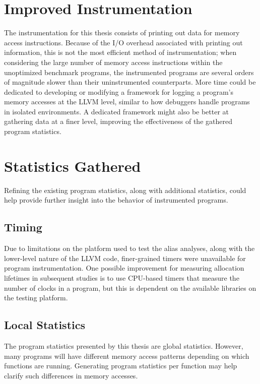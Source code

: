 \section{Improved Instrumentation}
The instrumentation for this thesis consists of printing out data for memory access instructions. Because of the I/O overhead associated with printing out information, this is not the most efficient method of instrumentation; when considering the large number of memory access instructions within the unoptimized benchmark programs, the instrumented programs are several orders of magnitude slower than their uninstrumented counterparts. More time could be dedicated to developing or modifying a framework for logging a program's memory accesses at the LLVM level, similar to how debuggers handle programs in isolated environments. A dedicated framework might also be better at gathering data at a finer level, improving the effectiveness of the gathered program statistics.

\section{Statistics Gathered}
Refining the existing program statistics, along with additional statistics, could help provide further insight into the behavior of instrumented programs.

\subsection{Timing}
Due to limitations on the platform used to test the alias analyses, along with the lower-level nature of the LLVM code, finer-grained timers were unavailable for program instrumentation. One possible improvement for measuring allocation lifetimes in subsequent studies is to use CPU-based timers that measure the number of clocks in a program, but this is dependent on the available libraries on the testing platform.

\subsection{Local Statistics}
The program statistics presented by this thesis are global statistics. However, many programs will have different memory access patterns depending on which functions are running. Generating program statistics per function may help clarify such differences in memory accesses.
